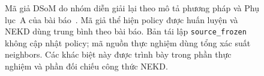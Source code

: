 \begin{figure}[!b]
\caption{Mã giả DSoM do nhóm diễn giải lại theo mô tả phương pháp
    và Phụ lục~A của bài báo~\cite{10.1145/3746027.3754576}.
    Mã giả thể hiện policy được huấn luyện và NEKD dùng trung bình
    theo bài báo. Bản tái lập \texttt{source\_frozen} không cập nhật
    policy; mã nguồn thực nghiệm dùng tổng xác suất neighbors.
    Các khác biệt này được trình bày trong phần thực nghiệm và
    phần đối chiếu công thức NEKD.}
\label{alg:dsom}
\end{figure}

